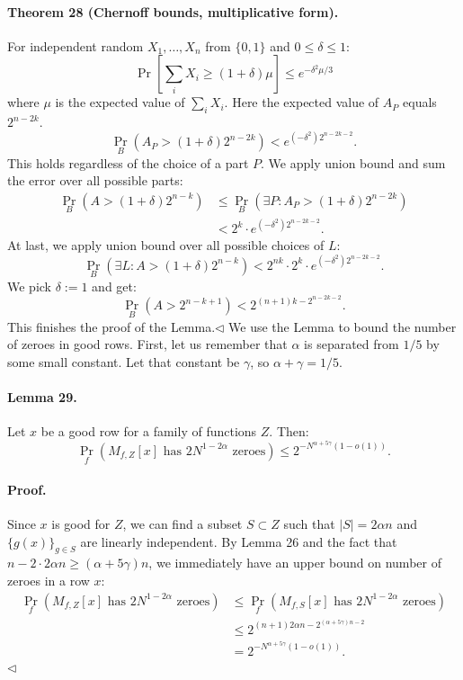 \documentclass[10pt,a4paper]{article}
\begin{document}
\paragraph{Theorem 28 (Chernoff bounds, multiplicative form).} For independent random $X_1,\ldots,X_n$ from $\{0,1\}$ and $0\leq\delta\leq1$:
\[\Pr\left[\sum_iX_i\geq(1+\delta)\mu\right]\leq e^{-\delta^2\mu/3}\]
where $\mu$ is the expected value of $\sum_iX_i$.
Here the expected value of $A_P$ equals $2^{n-2k}$.
\[\Pr_B(A_P>(1+\delta)2^{n-2k})<e^{(-\delta^2)2^{n-2k-2}}.\]
This holds regardless of the choice of a part $P$. We apply union bound and sum the error over all possible parts:
\begin{align*}
\Pr_B(A>(1+\delta)2^{n-k})&\leq\Pr_B(\exists P:A_P>(1+\delta)2^{n-2k})\\
&<2^k\cdot e^{(-\delta^2)2^{n-2k-2}}.
\end{align*}
At last, we apply union bound over all possible choices of $L$:
\[\Pr_B(\exists L:A>(1+\delta)2^{n-k})<2^{nk}\cdot2^k\cdot e^{(-\delta^2)2^{n-2k-2}}.\]
We pick $\delta:=1$ and get:
\[\Pr_B(A>2^{n-k+1})<2^{(n+1)k-2^{n-2k-2}}.\]
This finishes the proof of the Lemma.\hfill$\triangleleft$
We use the Lemma to bound the number of zeroes in good rows. First, let us remember that $\alpha$ is separated from $1/5$ by some small constant. Let that constant be $\gamma$, so $\alpha+\gamma=1/5$.
\paragraph{Lemma 29.} Let $x$ be a good row for a family of functions $Z$. Then:
\[\Pr_f(M_{f,Z}[x]\text{ has }2N^{1-2\alpha}\text{ zeroes})\leq2^{-N^{\alpha+5\gamma}(1-o(1))}.\]
\paragraph{Proof.} Since $x$ is good for $Z$, we can find a subset $S\subset Z$ such that $|S|=2\alpha n$ and $\{g(x)\}_{g\in S}$ are linearly independent. By Lemma 26 and the fact that $n-2\cdot2\alpha n\geq(\alpha+5\gamma)n$, we immediately have an upper bound on number of zeroes in a row $x$:
\begin{align*}
\Pr_f(M_{f,Z}[x]\text{ has }2N^{1-2\alpha}\text{ zeroes})
&\leq\Pr_f(M_{f,S}[x]\text{ has }2N^{1-2\alpha}\text{ zeroes})\\
&\leq2^{(n+1)2\alpha n-2^{(\alpha+5\gamma)n-2}}\\
&=2^{-N^{\alpha+5\gamma}(1-o(1))}.
\end{align*}\hfill$\triangleleft$
\end{document}
